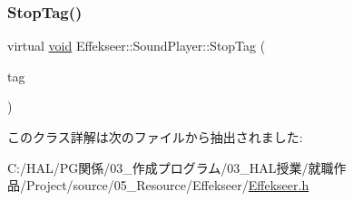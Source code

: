 \mbox{\label{class_effekseer_1_1_sound_player_a4726bc7f3f4049508a268f16a4beeb56}} 
\subsubsection{\texorpdfstring{Stop\+Tag()}{StopTag()}}
{\footnotesize\ttfamily virtual \mbox{\hyperlink{namespace_effekseer_ab34c4088e512200cf4c2716f168deb56}{void}} Effekseer\+::\+Sound\+Player\+::\+Stop\+Tag (\begin{DoxyParamCaption}\item[{\mbox{\hyperlink{namespace_effekseer_adb219197297396cf2ab9bee657551a29}{Sound\+Tag}}}]{tag }\end{DoxyParamCaption})\hspace{0.3cm}{\ttfamily [pure virtual]}}



このクラス詳解は次のファイルから抽出されました\+:\begin{DoxyCompactItemize}
\item 
C\+:/\+H\+A\+L/\+P\+G関係/03\+\_\+作成プログラム/03\+\_\+\+H\+A\+L授業/就職作品/\+Project/source/05\+\_\+\+Resource/\+Effekseer/\mbox{\hyperlink{_effekseer_8h}{Effekseer.\+h}}\end{DoxyCompactItemize}
